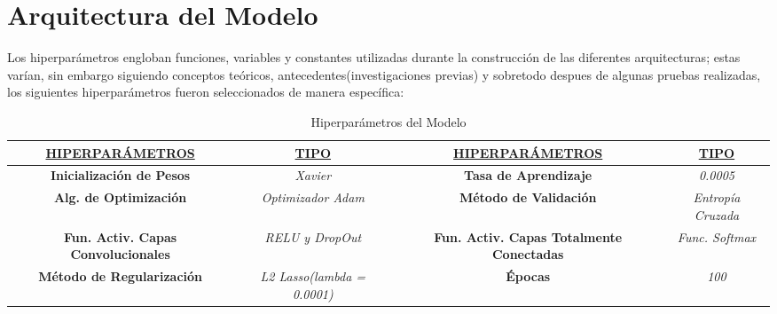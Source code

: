 	

\section{Arquitectura del Modelo}
	\vspace{-1.5em}

	Los hiperparámetros engloban funciones, variables y constantes utilizadas durante la construcción de las diferentes arquitecturas; estas varían, sin embargo siguiendo conceptos teóricos, antecedentes(investigaciones previas) y sobretodo despues de algunas pruebas realizadas, los siguientes hiperparámetros fueron seleccionados de manera específica:
		\begin{table}[H]
			\begin{center}
			\caption{\small{Hiperparámetros del Modelo}}
			\begin{tabular}{|>{\scriptsize}c|>{\scriptsize}c|>{\scriptsize}c|>{\scriptsize}c|}
			\hline
			{\ul \textbf{HIPERPARÁMETROS}}  & {\ul \textbf{TIPO}}       & {\ul \textbf{HIPERPARÁMETROS}}        & {\ul \textbf{TIPO}}        \\ \hline
			{\textbf{Inicialización de Pesos}}                     		& {\textit{Xavier}}  				  &
			\textbf{Tasa de Aprendizaje}                                & \textit{0.0005}                    \\ \hline
			\textbf{Alg. de Optimización}                               & \textit{Optimizador Adam}          &
			\textbf{Método de Validación}                               & \textit{Entropía Cruzada}          \\ \hline
			\textbf{Fun. Activ. Capas Convolucionales}        			& \textit{RELU y DropOut}                      &
			\textbf{Fun. Activ. Capas Totalmente Conectadas} 			& \textit{Func. Softmax}           \\ \hline
			\textbf{Método de Regularización}                           &\textit{L2 Lasso(lambda = 0.0001)} &
			\textbf{Épocas}                                             &\textit{100}		 				\\ \hline
			\end{tabular}
			\end{center}
		\end{table}
		\vspace{-1.5em}

